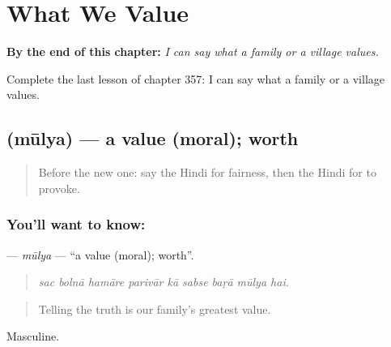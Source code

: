 
\chapter{What We Value}
\label{ch:hi-what-we-value}

\begin{chapteropening}
\textbf{By the end of this chapter:} \emph{I can say what a family or a village values.}

Complete the last lesson of chapter 357: I can say what a family or a village values.
\end{chapteropening}

\section[\texorpdfstring{\hi{मूल्य} (mūlya)}{मूल्य (mūlya)}]{ (mūlya) — a value (moral); worth}

\label{lesson:HI-C357-mulya}



\begin{quote}
Before the new one: say the Hindi for fairness, then the Hindi for to provoke.
\end{quote}

\subsection*{You'll want to know: }
\textbf{} — \emph{mūlya} — \textquotedblleft{}a value (moral); worth\textquotedblright{}.

\begin{quote}
        
\end{quote}

\begin{quote}
\emph{sac bolnā hamāre parivār kā sabse baṛā mūlya hai.}
\end{quote}

\begin{quote}
Telling the truth is our family's greatest value.
\end{quote}

Masculine.

